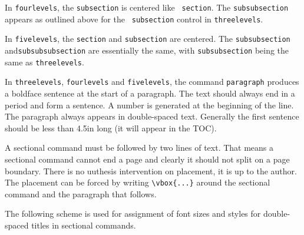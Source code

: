 In {\tt fourlevels}, the {\tt subsection} is centered like {\tt
section}. The {\tt subsubsection} appears as outlined above for the {\tt
subsection} control in {\tt threelevels}.

In {\tt fivelevels}, the {\tt section} and {\tt subsection} are
centered.
The {\tt subsubsection} and{\tt subsubsubsection} are essentially the
same, with {\tt subsubsection} being the same as {\tt threelevels}.

In {\tt threelevels}, {\tt fourlevels} and {\tt fivelevels}, the command
{\tt paragraph} produces a boldface sentence at the start of a
paragraph. The text should always end in a period and form a sentence. A
number is generated at the beginning of the line. The paragraph always
appears in double-spaced text. Generally the first sentence should be
less than 4.5in long (it will appear in the TOC).

A sectional command must be followed by two lines of text. That means a
sectional command cannot end a page and clearly it should not split on a
page boundary. There is no uuthesis intervention on placement, it is up
to the author. The placement can be forced by writing \verb"\vbox{...}"
around the sectional command and the paragraph that follows.

The following scheme is used for assignment of font sizes and styles for
double-spaced titles in sectional commands.

